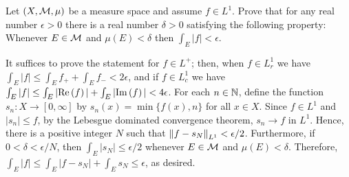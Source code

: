 \begin{prob}[Exercise 2.26]
    Let $(X, {\mathcal{M}}, \mu)$ be a measure space and assume $f\in L^1$.
    Prove that for any real number $\epsilon>0$ there is a real number $\delta>0$ satisfying the following property: Whenever $E\in{\mathcal{M}}$ and $\mu(E)<\delta$ then $\int_E |f|<\epsilon$.
\end{prob}
\begin{sol}
    It suffices to prove the statement for $f\in L^+$; then, when $f\in L^1_r$ we have $\int_E |f|\leq\int_E f_++\int_E f_-<2\epsilon$, and if $f\in L^1_c$ we have $\int_E |f|\leq\int_E|\textrm{Re}\left({f}\right)|+\int_E|\textrm{Im}\left({f}\right)|<4\epsilon$.
    For each $n\in{\mathbb{N}}$, define the function $s_n: X\rightarrow[0, \infty]$ by $s_n(x)=\min\{f(x), n\}$ for all $x\in X$.
    Since $f\in L^1$ and $|s_n|\leq f$, by the Lebesgue dominated convergence theorem, $s_n\rightarrow f$ in $L^1$.
    Hence, there is a positive integer $N$ such that ${\left\lVert{f-s_N}\right\rVert}_{L^1}<\epsilon/2$.
    Furthermore, if $0<\delta<\epsilon/N$, then $\int_E |s_N|\leq \epsilon/2$ whenever $E\in{\mathcal{M}}$ and $\mu(E)<\delta$.
    Therefore, $\int_E |f|\leq\int_E |f-s_N| + \int_E s_N\leq \epsilon$, as desired.
\end{sol}